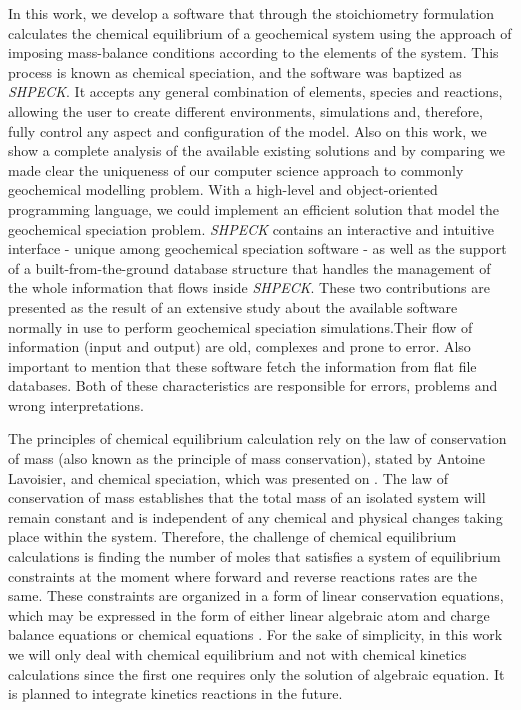 \documentclass[ppgc,mestrado,english]{iiufrgs}
\begin{document}

In this work, we develop a software that through the stoichiometry formulation calculates the chemical equilibrium of a geochemical system using the approach of imposing mass-balance conditions according to the elements of the system. This process is known as chemical speciation, and the software was baptized as \emph{SHPECK}. It accepts any general combination of elements, species and reactions, allowing the user to create different environments, simulations and, therefore, fully control any aspect and configuration of the model. Also on this work, we show a complete analysis of the available existing solutions and by comparing we made clear the uniqueness of our computer science approach to commonly geochemical modelling problem. With a high-level and object-oriented programming language, we could implement an efficient solution that model the geochemical speciation problem. \emph{SHPECK} contains an interactive and intuitive interface - unique among geochemical speciation software - as well as the support of a built-from-the-ground database structure that handles the management of the whole information that flows inside \emph{SHPECK}. These two contributions are presented as the result of an extensive study about the available software normally in use to perform geochemical speciation simulations.Their flow of information (input and output) are old, complexes and prone to error. Also important to mention that these software fetch the information from flat file databases. Both of these characteristics are responsible for errors, problems and wrong interpretations.


The principles of chemical equilibrium calculation rely on the law of conservation of mass (also known as the principle of mass conservation), stated by Antoine Lavoisier, and chemical speciation, which was presented on \cite{Garrels:65}. The law of conservation of mass establishes that the total mass of an isolated system will remain constant and is independent of any chemical and physical changes taking place within the system. Therefore, the challenge of chemical equilibrium calculations is finding the number of moles that satisfies a system of equilibrium constraints at the moment where forward and reverse reactions rates are the same. These constraints are organized in a form of linear conservation equations, which may be expressed in the form of either linear algebraic atom and charge balance equations or chemical equations \cite{SmithMissen83}. For the sake of simplicity, in this work we will only deal with chemical equilibrium and not with chemical kinetics calculations since the first one requires only the solution of algebraic equation. It is planned to integrate kinetics reactions in the future.
\end{document}
